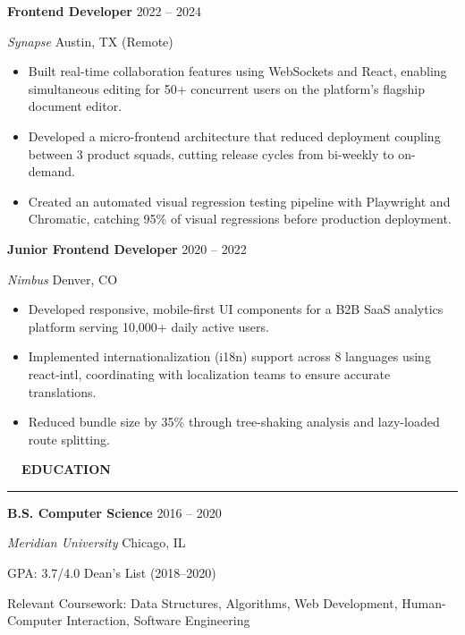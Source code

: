 \documentclass[11pt,a4paper]{article}
\begin{document}
\vspace{6pt}

{\bfseries Frontend Developer} \hfill {\color{secondary}2022 -- 2024}
\par
{\itshape Synapse} \textbar{} Austin, TX (Remote)
\begin{itemize}
  \item Built real-time collaboration features using WebSockets and React, enabling simultaneous editing for 50+ concurrent users on the platform's flagship document editor.
  \item Developed a micro-frontend architecture that reduced deployment coupling between 3 product squads, cutting release cycles from bi-weekly to on-demand.
  \item Created an automated visual regression testing pipeline with Playwright and Chromatic, catching 95\% of visual regressions before production deployment.
\end{itemize}

\vspace{6pt}

{\bfseries Junior Frontend Developer} \hfill {\color{secondary}2020 -- 2022}
\par
{\itshape Nimbus} \textbar{} Denver, CO
\begin{itemize}
  \item Developed responsive, mobile-first UI components for a B2B SaaS analytics platform serving 10,000+ daily active users.
  \item Implemented internationalization (i18n) support across 8 languages using react-intl, coordinating with localization teams to ensure accurate translations.
  \item Reduced bundle size by 35\% through tree-shaking analysis and lazy-loaded route splitting.
\end{itemize}

\vspace{10pt}

{\large\bfseries\color{primary}\faGraduationCap\ \ EDUCATION}\par
\vspace{2pt}
{\color{accent}\rule{\textwidth}{1.2pt}}\par
\vspace{8pt}

{\bfseries B.S. Computer Science} \hfill {\color{secondary}2016 -- 2020}
\par
{\itshape Meridian University} \textbar{} Chicago, IL
\par
GPA: 3.7/4.0 \textbar{} Dean's List (2018--2020)
\par
Relevant Coursework: Data Structures, Algorithms, Web Development, Human-Computer Interaction, Software Engineering
\end{document}
